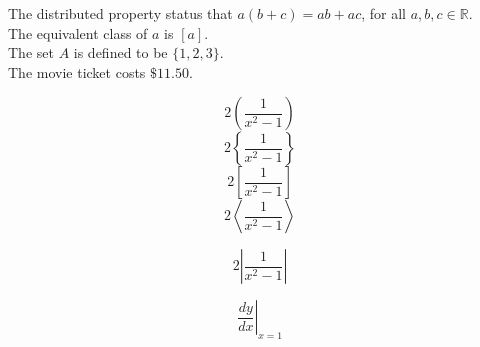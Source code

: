 \documentclass[options]{article}
\begin{document}
The distributed property status that $a(b+c)=ab+ac$, for all $a, b, c \in \mathbb{R}$.\\[6pt]
The equivalent class of $a$ is $[a]$.\\[6pt]
The set $A$ is defined to be $\{1, 2, 3\}$.\\[6pt]
The movie ticket costs $\$11.50$.

$$2\left(\frac{1}{x^2-1}\right)$$
$$2\left\{\frac{1}{x^2-1}\right\}$$
$$2\left[\frac{1}{x^2-1}\right]$$
$$2\left \langle \frac{1}{x^2-1} \right \rangle$$

$$2\left | \frac{1}{x^2-1} \right |$$

$$\left.\frac{dy}{dx}\right|_{x=1}$$
\end{document}
